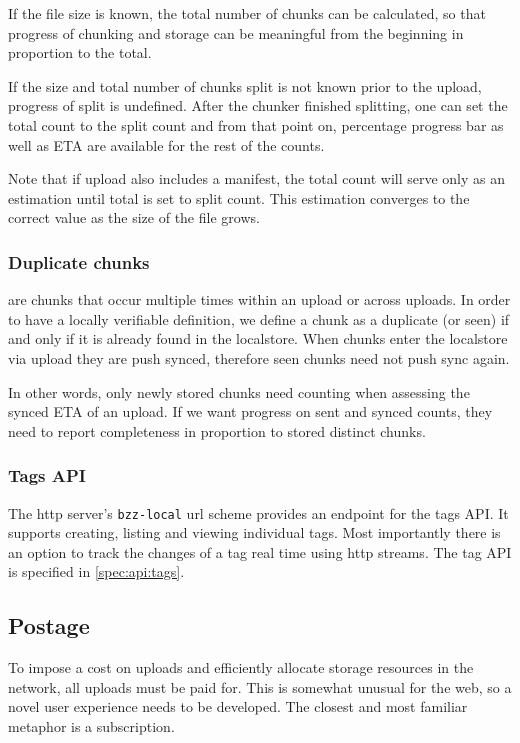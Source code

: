 If the file size is known, the total number of chunks can be calculated, so that progress of chunking and storage can be meaningful from the beginning in proportion to the total.

If the size and total number of chunks split is not known prior to the upload, progress of split is undefined. After the chunker finished splitting, one can set the total count to the split count and from that point on, percentage progress bar as well as ETA are available for the rest of the counts.

Note that if upload also includes a manifest, the total count will serve only as an estimation until total is set to split count. This estimation converges to the correct value as the size of the file grows.


\subsubsection{Duplicate chunks}

 are chunks that occur multiple times within an upload or across uploads. In order to have a locally verifiable definition, we define a chunk as a duplicate (or seen) if and only if it is already found in the localstore.
When chunks enter the localstore via upload they are push synced, therefore seen chunks need not push sync again.

In other words, only newly stored chunks need counting when assessing the synced ETA of an upload. If we want progress on sent and synced counts, they need to report completeness in proportion to stored distinct chunks.

\subsubsection{Tags API} 

The http server's \texttt{bzz-local} url scheme provides an endpoint for the tags API. It supports creating, listing and viewing individual tags. Most importantly there is an option to track the changes of a tag real time using http streams. The tag API is specified in \ref{spec:api:tags}.



\subsection{Postage}\label{sec:postage-ux}

To impose a cost on uploads and efficiently allocate storage resources in the network, all uploads must be paid for.  This is somewhat unusual for the web, so a novel user experience needs to be developed. The closest and most familiar metaphor is a subscription.

